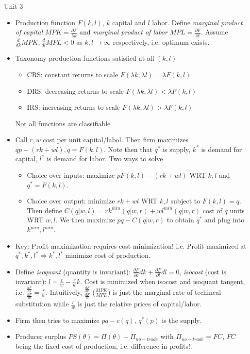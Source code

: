 \documentclass[10pt,twocolumn]{article}
\newcommand{\rd}[2]{\frac{d#1}{d#2}}
\newcommand{\pd}[2]{\frac{\partial #1}{\partial#2}}
\begin{document}
Unit 3
\begin{itemize}
    \item Production function $F(k,l)$, $k$ capital and $l$ labor. Define \emph{marginal product of capital} $MPK = \pd{F}{k}$ and \emph{marginal product of labor} $MPL = \pd{F}{l}$. Assume $\rd{}{k}MPK, \rd{}{l}MPL < 0$ as $k,l \to \infty$ respectively, i.e. optimum exists.
    \item Taxonomy production functions satisfied at all $(k,l)$
        \begin{itemize}
            \item CRS: constant returns to scale $F(\lambda k, \lambda l) = \lambda F(k,l)$
            \item DRS: decreasing returns to scale $F(\lambda k, \lambda l) < \lambda F(k,l)$
            \item IRS: increasing returns to scale $F(\lambda k, \lambda l) > \lambda F(k,l)$
        \end{itemize} Not all functions are classifiable
    \item Call $r, w$ cost per unit capital/labol. Then firm maximizes $qp - (rk + wl), q = F(k,l)$. Note then that $q^*$ is supply, $k^*$ is demand for capital, $l^*$ is demand for labor. Two ways to solve
        \begin{itemize}
            \item Choice over inputs: maximize $pF(k,l) - (rk + wl)$ WRT $k,l$ and $q^* = F(k,l)$.
            \item Choice over output: minimize $rk + wl$ WRT $k,l$ subject to $F(k,l) =  q$. Then define $C(q|w,l) = rk^{min}(q|w,r) + wl^{min}(q|w,r)$ cost of $q$ units WRT $w,l$. We then maximize $pq - C(q|w,r)$ to obtain $q^*$ and plug into $k^{min}, l^{min}$.
        \end{itemize}
    \item Key: Profit maximization requires cost minimization! i.e. Profit maximized at $q^*, k^*, l^* \Rightarrow k^*, l^*$ minimize cost of production.
    \item Define \emph{isoquant} (quantity is invariant): $\pd{F}{k}dk + \pd{F}{l}dl = 0$, \emph{isocost} (cost is invariant): $l = \frac{c}{w} - \frac{r}{w}k$. Cost is minimized when isocost and isoquant tangent, i.e. $\frac{\rd{F}{k}}{\rd{F}{l}} = \frac{r}{w}$. Intuitively, $\frac{\rd{F}{k}}{\rd{F}{l}}$ ($\frac{MPK}{MPL}$) is just the marginal rate of techincal substitution while $\frac{r}{w}$ is just the relative prices of capital/labor. 
    \item Firm then tries to maximize $pq - c(q)$, $q^*(p)$ is the supply.
    \item Producer surplus $PS(\theta) = \Pi(\theta) - \Pi_{no-trade}$ with $\Pi_{no-trade} = FC$, $FC$ being the fixed cost of production, i.e. difference in profits!. 
\end{itemize}
\end{document}
